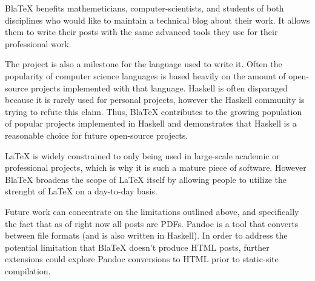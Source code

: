 BlaTeX benefits mathemeticians, computer-scientists, and students of both disciplines who would like to maintain a technical blog about their work. It allows them to write their posts with the same advanced tools they use for their professional work. 

The project is also a milestone for the language used to write it. Often the popularity of computer science languages is based heavily on the amount of open-source projects implemented with that language. Haskell is often disparaged because it is rarely used for personal projects, however the Haskell community is trying to refute this claim. Thus, BlaTeX contributes to the growing population of popular projects implemented in Haskell and demonstrates that Haskell is a reasonable choice for future open-source projects. 

LaTeX is widely constrained to only being used in large-scale academic or professional projects, which is why it is such a mature piece of software. However BlaTeX broadens the scope of LaTeX itself by allowing people to utilize the strenght of LaTeX on a day-to-day basis. 

Future work can concentrate on the limitations outlined above, and specifically the fact that as of right now all posts are PDFs. Pandoc is a tool that converts between file formats (and is also written in Haskell). In order to address the potential limitation that BlaTeX doesn't produce HTML posts, further extensions could explore Pandoc conversions to HTML prior to static-site compilation. 